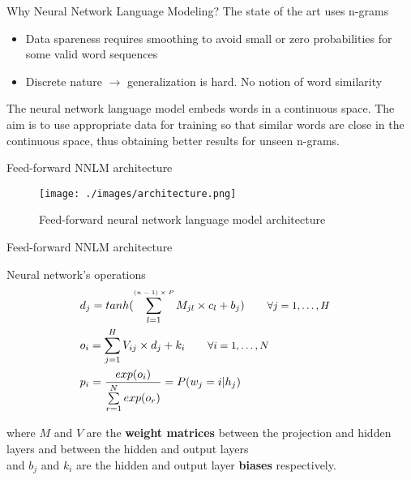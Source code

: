 \documentclass{beamer}
\begin{document}
\begin{frame}{Why Neural Network Language Modeling?}
	The state of the art uses n-grams
	\begin{itemize}
		\item Data spareness requires smoothing to avoid small or zero probabilities for some valid word sequences
		\item Discrete nature $\rightarrow$ generalization is hard. No notion of word similarity
	\end{itemize}
	\vspace{5mm}
	The neural network language model embeds words in a continuous space. The aim is to use appropriate data for training so that similar words are close in the continuous space, thus obtaining better results for unseen n-grams.
\end{frame}

\begin{frame}{Feed-forward NNLM architecture}

\begin{figure}[!htb]\centering
    \texttt{[image: ./images/architecture.png]}
    \caption{Feed-forward neural network language model architecture}\label{diagram:architecture}
\end{figure}

\end{frame}


\begin{frame}{Feed-forward NNLM architecture}

\begin{exampleblock}{Neural network's operations}
\begin{equation}
\left.\begin{aligned}
    &d_j = tanh(\sum\limits_{l=1}^{\text{\tiny{$(n-1) \times P$}}}{M_{jl} \times c_l + b_j}) \qquad \text{\small{$\forall j = 1, \ldots, H$}}&\\
    &o_i = \sum\limits_{j=1}^{H}{V_{ij} \times d_j + k_i} \qquad \text{\small{$\forall i = 1, \ldots, N$}}&\\
    &p_i = \frac{exp(o_i)}{\sum\limits_{r=1}^{N}{exp(o_r)}} = P(w_j = i | h_j)&\\
\end{aligned}\right.
\end{equation}
\end{exampleblock}

where $M$ and $V$ are the \textbf{weight matrices} between the projection and hidden layers and between the hidden and output layers \\and $b_j$ and $k_i$ are the hidden and output layer \textbf{biases} respectively.

\end{frame}
\end{document}
